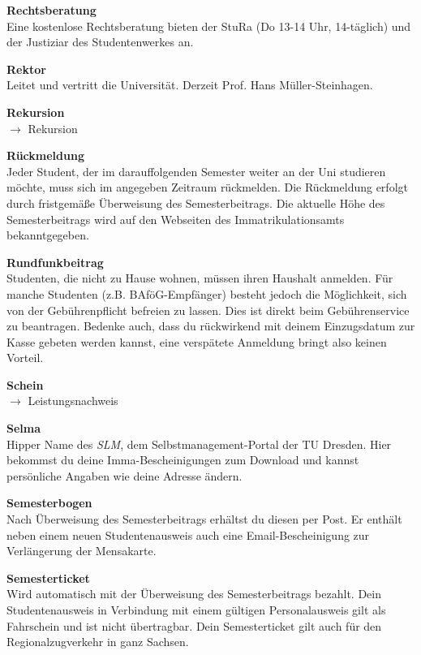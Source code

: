 \begin{multicols}{2}
\textbf{Rechtsberatung} \\
Eine kostenlose Rechtsberatung bieten der StuRa (Do 13-14 Uhr, 14-täglich) und der Justiziar des Studentenwerkes an.  %

\textbf{Rektor} \\
Leitet und vertritt die Universität.
Derzeit Prof. Hans Müller-Steinhagen.

\textbf{Rekursion} \\
$\rightarrow$ Rekursion

\vfill\columnbreak

\textbf{Rückmeldung} \\
Jeder Student, der im darauffolgenden Semester weiter an der Uni studieren möchte, muss sich im angegeben Zeitraum rückmelden.
Die Rückmeldung erfolgt durch fristgemäße Überweisung des Semesterbeitrags.
Die aktuelle Höhe des Semesterbeitrags wird auf den Webseiten des Immatrikulationsamts bekanntgegeben. 

\textbf{Rundfunkbeitrag} \\
Studenten, die nicht zu Hause wohnen, müssen ihren Haushalt anmelden.
Für manche Studenten (z.B. BAföG-Empfänger) besteht jedoch die Möglichkeit, sich von der Gebührenpflicht befreien zu lassen.
Dies ist direkt beim Gebührenservice zu beantragen.
Bedenke auch, dass du rückwirkend mit deinem Einzugsdatum zur Kasse gebeten werden kannst, eine verspätete Anmeldung bringt also keinen Vorteil.

\textbf{Schein} \\
$\rightarrow$ Leistungsnachweis

\textbf{Selma} \\
Hipper Name des \textit{SLM}, dem Selbst\-management-Portal der TU Dresden.
Hier bekommst du deine Imma-Bescheinigungen zum Download und kannst persönliche Angaben wie deine Adresse ändern. 

\textbf{Semesterbogen} \\
Nach Überweisung des Semesterbeitrags erhältst du diesen per Post.
Er enthält neben einem neuen Studentenausweis auch eine Email-Bescheinigung zur Verlängerung der Mensakarte.

\vfill\columnbreak

\textbf{Semesterticket} \\
Wird automatisch mit der Überweisung des Semesterbeitrags bezahlt.
Dein Studentenausweis in Verbindung mit einem gültigen Personalausweis gilt als Fahrschein und ist nicht übertragbar.
Dein Semesterticket gilt auch für den Regionalzugverkehr in ganz Sachsen.


\end{multicols}
